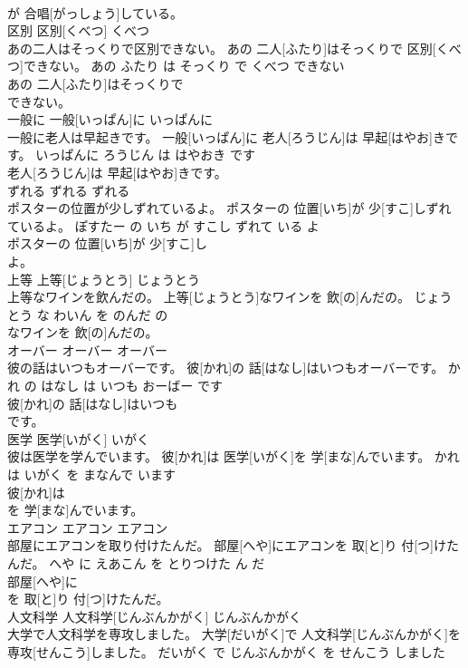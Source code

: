 \documentclass[8pt]{extreport}
\begin{document}
\begin{CJK}{UTF8}{min}
\\	が 合唱[がっしょう]している。			
\\	区別	区別[くべつ]	くべつ	
\\	あの二人はそっくりで区別できない。	あの 二人[ふたり]はそっくりで 区別[くべつ]できない。	あの ふたり は そっくり で くべつ できない	
\\	あの 二人[ふたり]はそっくりで
\\	できない。			
\\	一般に	一般[いっぱん]に	いっぱんに	
\\	一般に老人は早起きです。	一般[いっぱん]に 老人[ろうじん]は 早起[はやお]きです。	いっぱんに ろうじん は はやおき です	
\\	老人[ろうじん]は 早起[はやお]きです。			
\\	ずれる	ずれる	ずれる	
\\	ポスターの位置が少しずれているよ。	ポスターの 位置[いち]が 少[すこ]しずれているよ。	ぽすたー の いち が すこし ずれて いる よ	
\\	ポスターの 位置[いち]が 少[すこ]し
\\	よ。			
\\	上等	上等[じょうとう]	じょうとう	
\\	上等なワインを飲んだの。	上等[じょうとう]なワインを 飲[の]んだの。	じょうとう な わいん を のんだ の	
\\	なワインを 飲[の]んだの。			
\\	オーバー	オーバー	オーバー	
\\	彼の話はいつもオーバーです。	彼[かれ]の 話[はなし]はいつもオーバーです。	かれ の はなし は いつも おーばー です	
\\	彼[かれ]の 話[はなし]はいつも
\\	です。			
\\	医学	医学[いがく]	いがく	
\\	彼は医学を学んでいます。	彼[かれ]は 医学[いがく]を 学[まな]んでいます。	かれ は いがく を まなんで います	
\\	彼[かれ]は
\\	を 学[まな]んでいます。			
\\	エアコン	エアコン	エアコン	
\\	部屋にエアコンを取り付けたんだ。	部屋[へや]にエアコンを 取[と]り 付[つ]けたんだ。	へや に えあこん を とりつけた ん だ	
\\	部屋[へや]に
\\	を 取[と]り 付[つ]けたんだ。			
\\	人文科学	人文科学[じんぶんかがく]	じんぶんかがく	
\\	大学で人文科学を専攻しました。	大学[だいがく]で 人文科学[じんぶんかがく]を 専攻[せんこう]しました。	だいがく で じんぶんかがく を せんこう しました	

\end{CJK}
\end{document}

